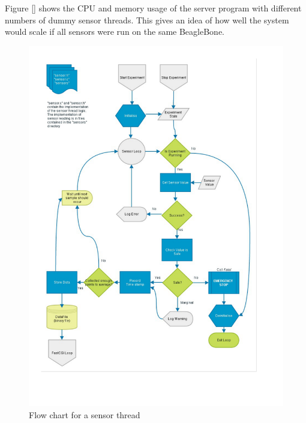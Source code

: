 Figure \ref{} shows the CPU and memory usage of the server program with different numbers of dummy sensor threads. This gives an idea of how well the system would scale if all sensors were run on the same BeagleBone.

\pagebreak
\begin{figure}[H]
	\centering
	\includegraphics[width=1.1\textwidth]{figures/sensor_thread.pdf}
	\caption{Flow chart for a sensor thread} 
	\label{sensor_thread.pdf}
\end{figure}
\pagebreak
\pagebreak

